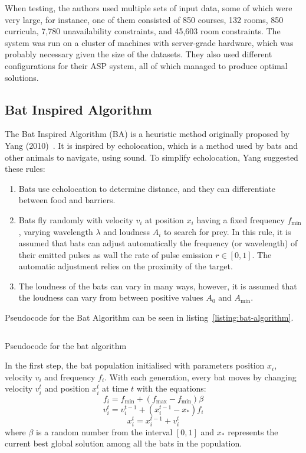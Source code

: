 When testing, the authors used multiple sets of input data, some of which were 
very large, for instance, one of them consisted of 850 courses, 132 rooms, 850 
curricula, 7,780 unavailability constraints, and 45,603 room constraints.
The system was run on a cluster of machines with server-grade hardware, which 
was probably necessary given the size of the datasets.
They also used different configurations for their ASP system, all of which 
managed to produce optimal solutions.

\subsection{Bat Inspired Algorithm}

The Bat Inspired Algorithm (BA) is a heuristic method originally proposed by 
Yang (2010)~\cite{yang_bat}.
It is inspired by echolocation, which is a method used by bats and other animals
to navigate, using sound.
To simplify echolocation, Yang suggested these rules:
\begin{enumerate}
	\item Bats use echolocation to determine distance, and they can
		differentiate between food and barriers.
	\item Bats fly randomly with velocity \( v_i \) at position \( x_i \) having
		a fixed frequency \( f_{\min} \), varying wavelength \( \lambda \) and 
		loudness \( A_i \) to search for prey.
		In this rule, it is assumed that bats can adjust automatically the
		frequency (or wavelength) of their emitted pulses as wall the rate of
		pulse emission \( r \in [0,1] \).
		The automatic adjustment relies on the proximity of the target.
	\item The loudness of the bats can vary in many ways, however, it is assumed
		that the loudness can vary from between positive values \( A_0 \) and 
		\( A_{\min} \).
\end{enumerate}
Pseudocode for the Bat Algorithm can be seen in 
listing~\ref*{listing:bat-algorithm}.

\begin{listing}[!ht]
	\inputminted[linenos, fontsize=\footnotesize]{text}{code/bat-algorithm.txt}
	\caption{Pseudocode for the bat algorithm ~\cite{ba_example}}
	\label{listing:bat-algorithm}
\end{listing}

In the first step, the bat population initialised with parameters position
\( x_i \), velocity \( v_i \) and frequency \( f_i \).
With each generation, every bat moves by changing velocity \( v_i^t \) and 
position \( x_i^t \) at time \( t \) with the equations:
\begin{equation}
	f_i = f_{\min} + (f_{\max} - f_{\min}) \beta
\end{equation}
\begin{equation}
	v_i^t = v_i^{t-1} + (x_i^{t-1} - x_*) f_i
\end{equation}
\begin{equation}
	x_i^t = x_i^{t-1} + v_i^t
\end{equation}
where \( \beta \) is a random number from the interval \( [0,1] \) and \( x_* \)
represents the current best global solution among all the bats in the
population.

